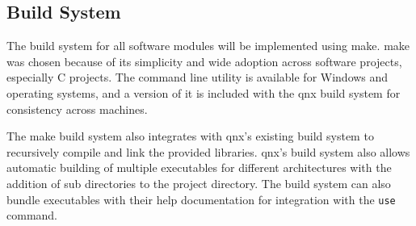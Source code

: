 \subsection{Build System}

The build system for all software modules will be implemented using \gls{make}. \Gls{make} was chosen because of its
simplicity and wide adoption across software projects, especially C projects. The command line utility is available for
Windows and  operating systems, and a version of it is included with the \gls{qnx} build system for
consistency across machines.

The \gls{make} build system also integrates with \gls{qnx}'s existing build system to recursively compile and link the
provided libraries. \Gls{qnx}'s build system also allows automatic building of multiple executables for different
architectures with the addition of sub directories to the project directory. \cite{qnx-dir-structure} The build system
can also bundle executables with their help documentation for integration with the \texttt{use} command.
\cite{qnx-dir-structure}
